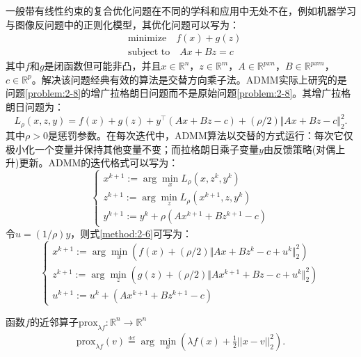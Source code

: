 一般带有线性约束的复合优化问题在不同的学科和应用中无处不在，例如机器学习与图像反问题中的正则化模型，其优化问题可以写为：
\begin{equation}\label{problem:2-8}
	\begin{aligned}
		&\text{minimize}\quad f(x)+g(z)\\
		&\text{subject\ to}\quad Ax + Bz = c
	\end{aligned}
\end{equation}
其中$f$和$g$是闭函数但可能非凸，并且$x\in\mathbb{R}^n$，$z\in\mathbb{R}^m$，$A\in\mathbb{R}^{pxn}$，$B\in\mathbb{R}^{pxm}$，$c\in\mathbb{R}^p$。解决该问题经典有效的算法是交替方向乘子法。ADMM实际上研究的是问题\eqref{problem:2-8}的增广拉格朗日问题而不是原始问题\eqref{problem:2-8}。其增广拉格朗日问题为：
\begin{equation}\label{equation:2-5}
	L_\rho(x,z,y)=f(x)+g(z)+y^{\top}(Ax+Bz-c)+(\rho/2)\Vert{Ax+Bz-c}\Vert_2^2.
\end{equation}
其中$\rho>0$是惩罚参数。在每次迭代中，ADMM算法以交替的方式运行：每次它仅极小化一个变量并保持其他变量不变；而拉格朗日乘子变量$y$由反馈策略(对偶上升)更新。ADMM的迭代格式可以写为：
\begin{equation}\label{method:2-6}
	\begin{cases}
		x^{k+1}:=\arg\min_{x}{L_{\rho}(x,z^k,y^k)} \\
		z^{k+1}:=\arg\min_{z}{L_{\rho}(x^{k+1},z,y^k)} \\
		y^{k+1}:= y^k+\rho{(Ax^{k+1}+Bz^{k+1}-c)}
	\end{cases}
\end{equation}
令$u=(1/\rho)y$，则式\eqref{method:2-6}可写为：
\begin{equation}\label{method:2-7}
	\begin{cases}
		x^{k+1}:=\arg\min_{x}\left({f(x)+(\rho/2)\Vert{Ax+Bz^k-c+u^k}\Vert^2_2}\right) \\
		z^{k+1}:=\arg\min_{z}\left({g(z)+(\rho/2)\Vert{Ax^{k+1}+Bz-c+u^k}\Vert^2_2}\right) \\
		u^{k+1}:=u^k+(Ax^{k+1}+Bz^{k+1}-c)
	\end{cases}
\end{equation}

\begin{definition}\label{def:2-4}
	函数$f$的近邻算子$\text{prox}_{\lambda{f}}:\mathbb{R}^n\to\mathbb{R}^n$
	\begin{equation}\label{proximal-operator}
		\begin{aligned}
			\text{prox}_{\lambda f}(v)\overset{\underset{\mathrm{def}}{}}{=}\arg\min_{x}\left({\lambda f(x)+\frac{1}{2}||x-v||_2^2}\right).
		\end{aligned}
	\end{equation} 
\end{definition}

